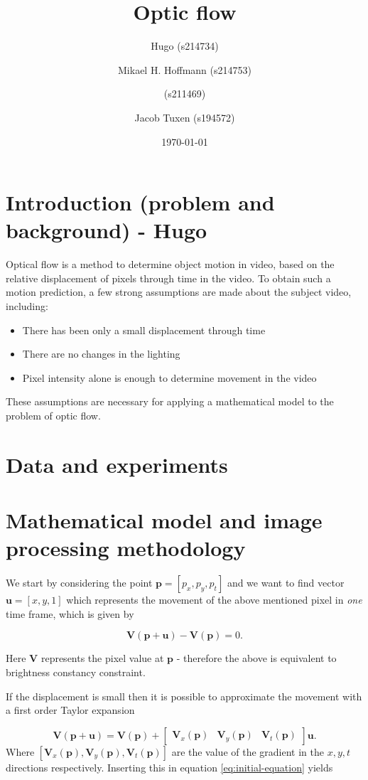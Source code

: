 \documentclass{article}
\title{Optic flow}
\author{Hugo (s214734) \and Mikael H. Hoffmann (s214753) \and (s211469) \and Jacob Tuxen (s194572)}
\date{\today}
\begin{document}
\maketitle

\section{Introduction (problem and background) - Hugo}
Optical flow is a method to determine object motion in video, based on the relative displacement of pixels
through time in the video. To obtain such a motion prediction, a few strong assumptions are made
about the subject video, including:
\begin{itemize}
    \item There has been only a small displacement through time
    \item There are no changes in the lighting
    \item Pixel intensity alone is enough to determine movement in the video
\end{itemize}
These assumptions are necessary for applying a mathematical model to the problem of optic flow.

\section{Data and experiments}




\section{Mathematical model and image processing methodology}
We start by considering the point $\boldsymbol{p} = [p_x, p_y, p_t]$ and we want to find vector $\boldsymbol{u} = [x, y, 1]$ which represents the movement of the above mentioned pixel in \emph{one} time frame, which is given by

\begin{equation}\label{eq:initial-equation}
    \boldsymbol{V(p + u)} - \boldsymbol{V(p)} = 0.
\end{equation}

Here $\boldsymbol{V}$ represents the pixel value at $\boldsymbol{p}$ - therefore the above is equivalent to brightness constancy constraint. 

If the displacement is small then it is possible to  approximate the movement with a first order Taylor expansion

\begin{equation}
    \boldsymbol{V(p + u)} = \boldsymbol{V(p)} + \begin{bmatrix}
        \boldsymbol{V}_x(\boldsymbol{p}) & \boldsymbol{V}_y(\boldsymbol{p}) & \boldsymbol{V}_t(\boldsymbol{p})
    \end{bmatrix} \boldsymbol{u}.
\end{equation}
Where $[\boldsymbol{V}_x(\boldsymbol{p}),\boldsymbol{V}_y(\boldsymbol{p}),\boldsymbol{V}_t(\boldsymbol{p})]$ are the value of the gradient in the $x,y,t$ directions respectively. Inserting this in equation \ref{eq:initial-equation} yields
\end{document}
